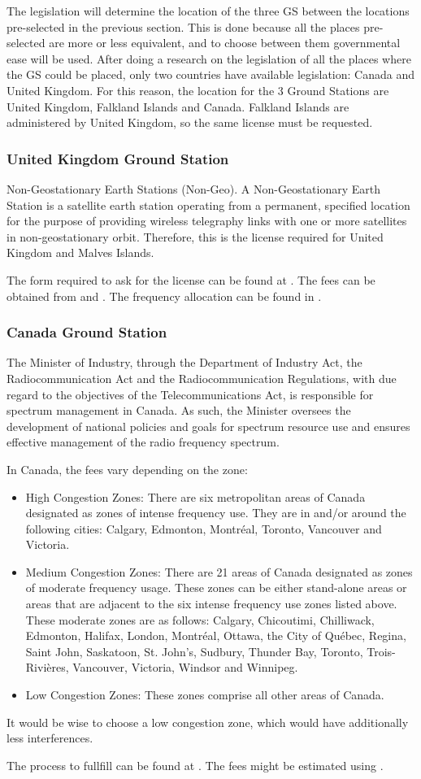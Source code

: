 The legislation will determine the location of the three GS between the locations pre-selected in the previous section. This is done because all the places pre-selected are more or less equivalent, and to choose between them governmental ease will be used. After doing a research on the legislation of all the places where the GS could be placed, only two countries have available legislation: Canada and United Kingdom. For this reason, the location for the 3 Ground Stations are United Kingdom, Falkland Islands and Canada. Falkland Islands are administered by United Kingdom, so the same license must be requested.

\subsubsection{United Kingdom Ground Station}
Non-Geostationary Earth Stations (Non-Geo). A Non-Geostationary Earth Station is a satellite earth station operating from a permanent, specified location for the purpose of providing wireless telegraphy links with one or more satellites in non-geostationary orbit. Therefore, this is the license required for United Kingdom and Malves Islands.

The form required to ask for the license can be found at \cite{UKForm}. The fees can be obtained from \cite{UKFees} and \cite{UKMHzFees}. The frequency allocation can be found in \cite{UKAllocation}.

\subsubsection{Canada Ground Station}
The Minister of Industry, through the Department of Industry Act, the Radiocommunication Act and the Radiocommunication Regulations, with due regard to the objectives of the Telecommunications Act, is responsible for spectrum management in Canada. As such, the Minister oversees the development of national policies and goals for spectrum resource use and ensures effective management of the radio frequency spectrum.

In Canada, the fees vary depending on the zone:
\begin{itemize}
\item High Congestion Zones: There are six metropolitan areas of Canada designated as zones of intense frequency use. They are in and/or around the following cities: Calgary, Edmonton, Montréal, Toronto, Vancouver and Victoria.
\item Medium Congestion Zones: There are 21 areas of Canada designated as zones of moderate frequency usage. These zones can be either stand-alone areas or areas that are adjacent to the six intense frequency use zones listed above. These moderate zones are as follows: Calgary, Chicoutimi, Chilliwack, Edmonton, Halifax, London, Montréal, Ottawa, the City of Québec, Regina, Saint John, Saskatoon, St. John's, Sudbury, Thunder Bay, Toronto, Trois-Rivières, Vancouver, Victoria, Windsor and Winnipeg.
\item Low Congestion Zones: These zones comprise all other areas of Canada.
\end{itemize}

It would be wise to choose a low congestion zone, which would have additionally less interferences. 

The process to fullfill can be found at \cite{CndForm}. The fees might be estimated using \cite{CndFees}.